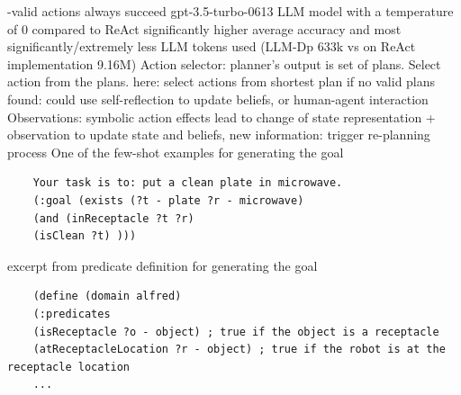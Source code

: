 \documentclass{article}
\begin{document}
-valid actions always succeed
gpt-3.5-turbo-0613 LLM model with a temperature of 0
compared to ReAct significantly higher average accuracy and most significantly/extremely less LLM tokens used (LLM-Dp 633k vs on ReAct implementation 9.16M)
Action selector: planner's output is set of plans. Select action from the plans. here: select actions from shortest plan
if no valid plans found: could use self-reflection to update beliefs, or human-agent interaction
Observations: symbolic action effects lead to change of state representation +  observation to update state and beliefs, new information: trigger re-planning process
One of the few-shot examples for generating the goal
\begin{verbatim}
	Your task is to: put a clean plate in microwave. 
	(:goal (exists (?t - plate ?r - microwave) 
	(and (inReceptacle ?t ?r) 
	(isClean ?t) )))
\end{verbatim}
excerpt from predicate definition for generating the goal
\begin{verbatim}
	(define (domain alfred) 
	(:predicates 
	(isReceptacle ?o - object) ; true if the object is a receptacle 
	(atReceptacleLocation ?r - object) ; true if the robot is at the receptacle location
	...
\end{verbatim}
\end{document}
